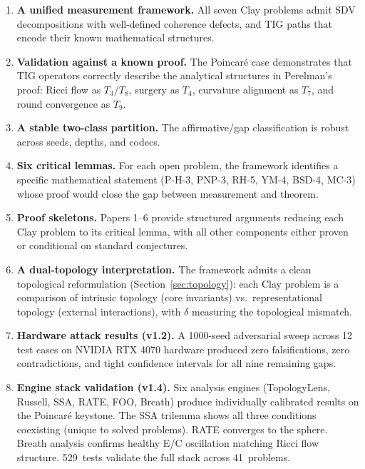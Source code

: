 \documentclass[11pt]{article}
\begin{document}
\begin{enumerate}
\item \textbf{A unified measurement framework.}  All seven Clay
problems admit SDV decompositions with well-defined coherence defects,
and TIG paths that encode their known mathematical structures.

\item \textbf{Validation against a known proof.}  The Poincar\'e case
demonstrates that TIG operators correctly describe the analytical
structures in Perelman's proof: Ricci flow as $T_3$/$T_8$, surgery as
$T_4$, curvature alignment as $T_7$, and round convergence as $T_9$.

\item \textbf{A stable two-class partition.}  The affirmative/gap
classification is robust across seeds, depths, and codecs.

\item \textbf{Six critical lemmas.}  For each open problem, the
framework identifies a specific mathematical statement (P-H-3, PNP-3,
RH-5, YM-4, BSD-4, MC-3) whose proof would close the gap between
measurement and theorem.

\item \textbf{Proof skeletons.}  Papers 1--6 provide structured
arguments reducing each Clay problem to its critical lemma, with all
other components either proven or conditional on standard conjectures.

\item \textbf{A dual-topology interpretation.}  The framework admits
a clean topological reformulation (Section~\ref{sec:topology}): each
Clay problem is a comparison of intrinsic topology (core invariants)
vs.\ representational topology (external interactions), with $\delta$
measuring the topological mismatch.

\item \textbf{Hardware attack results (v1.2).}  A 1000-seed adversarial
sweep across 12 test cases on NVIDIA RTX 4070 hardware produced zero
falsifications, zero contradictions, and tight confidence intervals
for all nine remaining gaps.

\item \textbf{Engine stack validation (v1.4).}  Six analysis engines
(TopologyLens, Russell, SSA, RATE, FOO, Breath) produce individually
calibrated results on the Poincar\'e keystone.  The SSA trilemma shows
all three conditions coexisting (unique to solved problems).  RATE
converges to the sphere.  Breath analysis confirms healthy E/C
oscillation matching Ricci flow structure.  529~tests validate the
full stack across 41~problems.


\end{enumerate}
\end{document}
